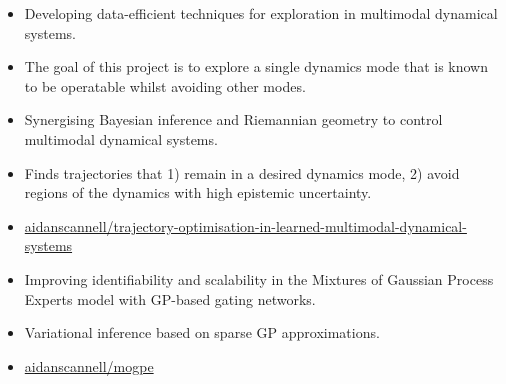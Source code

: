 \documentclass[10pt,a4paper,ragged2e,withhyper]{altacv}
\begin{document}
\begin{paracol}{2}
\label{sec:org3123a44}

\begin{itemize}
\item Developing data-efficient techniques for exploration in multimodal dynamical systems.
\item The goal of this project is to explore a single dynamics mode that is known to be operatable whilst avoiding other modes.
\end{itemize}


\newpage

\label{sec:org52bf427}

\begin{itemize}
\item Synergising Bayesian inference and Riemannian geometry to control multimodal dynamical systems.
\item Finds trajectories that 1) remain in a desired dynamics mode, 2) avoid regions of the dynamics with high epistemic uncertainty.
\item \href{https://github.com/aidanscannell/trajectory-optimisation-in-learned-multimodal-dynamical-systems}{\faGithub aidanscannell/trajectory-optimisation-in-learned-multimodal-dynamical-systems}
\end{itemize}

\par\divider


\begin{itemize}
\item Improving identifiability and scalability in the Mixtures of Gaussian Process Experts model with GP-based gating networks.
\item Variational inference based on sparse GP approximations.
\item \href{https://github.com/aidanscannell/mogpe}{\faGithub aidanscannell/mogpe}
\end{itemize}


\end{paracol}
\end{document}
